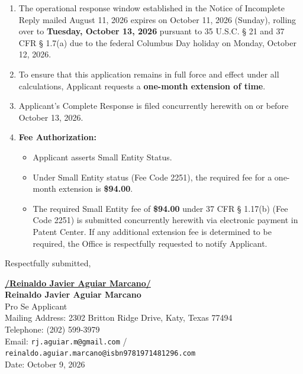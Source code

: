 \documentclass[11pt,letterpaper]{article}
\begin{document}
\begin{enumerate}[leftmargin=2em, itemsep=4pt]
    \item The operational response window established in the Notice of Incomplete Reply mailed August 11, 2026 expires on October 11, 2026 (Sunday), rolling over to \textbf{Tuesday, October 13, 2026} pursuant to 35 U.S.C. \S{} 21 and 37 CFR \S{} 1.7(a) due to the federal Columbus Day holiday on Monday, October 12, 2026.
    \item To ensure that this application remains in full force and effect under all calculations, Applicant requests a \textbf{one-month extension of time}.
    \item Applicant's Complete Response is filed concurrently herewith on or before October 13, 2026.
    \item \textbf{Fee Authorization:} 
    \begin{itemize}
        \item Applicant asserts Small Entity Status.
        \item Under Small Entity status (Fee Code 2251), the required fee for a one-month extension is \textbf{\$94.00}.
        \item The required Small Entity fee of \textbf{\$94.00} under 37 CFR \S{} 1.17(b) (Fee Code 2251) is submitted concurrently herewith via electronic payment in Patent Center. If any additional extension fee is determined to be required, the Office is respectfully requested to notify Applicant.
    \end{itemize}
\end{enumerate}

\vspace{1.0cm}
\begin{singlespace}
\noindent Respectfully submitted, \par\vspace{1.5cm}
\underline{\textbf{/Reinaldo Javier Aguiar Marcano/}} \\
\textbf{Reinaldo Javier Aguiar Marcano} \\
Pro Se Applicant \\
Mailing Address: 2302 Britton Ridge Drive, Katy, Texas 77494 \\
Telephone: (202) 599-3979 \\
Email: \texttt{rj.aguiar.m@gmail.com} / \texttt{reinaldo.aguiar.marcano@isbn9781971481296.com} \\
Date: October 9, 2026
\end{singlespace}
\end{document}
